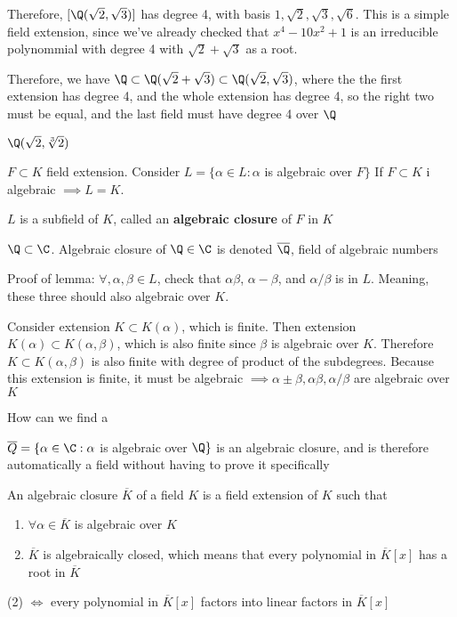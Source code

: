 \documentclass[10pt]{article}
\begin{document}
Therefore, $[\Q(\sqrt2, \sqrt3)]$ has degree 4, with basis $1, \sqrt{2}, \sqrt{3}, \sqrt{6}$. This is a simple field extension, since we've already checked that $x^4 - 10x^2 + 1$ is an irreducible polynommial with degree 4 with $\sqrt{2} + \sqrt{3}$ as a root. 

Therefore, we have $\Q \subset \Q(\sqrt2 + \sqrt3) \subset \Q(\sqrt2, \sqrt3)$, where the the first extension has degree 4, and the whole extension has degree 4, so the right two must be equal, and the last field must have degree 4 over $\Q$

\begin{exm*}
    $\Q(\sqrt{2}, \sqrt[3]{2})$
\end{exm*}

$F \subset K$ field extension. Consider $L = \{ \alpha \in L : \alpha$ is algebraic over $F \}$ If $F\subset K$ i algebraic $\implies L = K$. 

\begin{lem}
    $L$ is a subfield of $K$, called an \textbf{algebraic closure} of $F$ in $K$
\end{lem}

\begin{exm*}
    $\Q \subset \C$. Algebraic closure of $\Q \in \C$ is denoted $\overline{\Q}$, field of algebraic numbers
\end{exm*}
Proof of lemma: $\forall, \alpha, \beta \in L$, check that $\alpha\beta$, $\alpha - \beta$, and $\alpha/\beta$ is in $L$. Meaning, these three should also algebraic over $K$.

Consider extension $K \subset K(\alpha)$, which is finite. Then extension $K(\alpha) \subset K(\alpha, \beta)$, which is also finite since $\beta$ is algebraic over $K$. Therefore $K \subset K(\alpha, \beta)$ is also finite with degree of product of the subdegrees. Because this extension is finite, it must be algebraic $\implies \alpha \pm \beta, \alpha\beta, \alpha/\beta$ are algebraic over $K$

\begin{rmk}
    How can we find a 
\end{rmk}

\begin{exm*}
    $\overline{Q} = \{ \alpha \in \C : \alpha$ is algebraic over $\Q\}$ is an algebraic closure, and is therefore automatically a field without having to prove it specifically
\end{exm*}

\begin{defn}
    An algebraic closure $\overline{K}$ of a field $K$ is a field extension of $K$ such that \begin{enumerate}
        \item $\forall\alpha \in \overline{K}$ is algebraic over $K$
        \item $\overline{K}$ is algebraically closed, which means that every polynomial in $\overline{K}[x]$ has a root in $\overline{K}$
    \end{enumerate}
\end{defn}
(2) $\iff$ every polynomial in $\overline{K}[x]$ factors into linear factors in $\overline{K}[x]$
\end{document}
